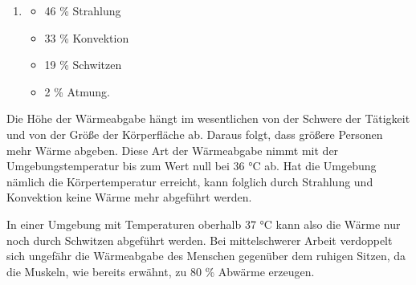 \begin{enumerate}
\item 
\begin{itemize}
	\item  46 \% Strahlung
	\item  33 \% Konvektion
	\item  19 \% Schwitzen
	\item   2 \% Atmung.
\end{itemize}
\end{enumerate}	

Die Höhe der Wärmeabgabe hängt im wesentlichen von der Schwere der Tätigkeit und von der Größe der Körperfläche ab. Daraus folgt, dass größere Personen mehr Wärme abgeben. Diese Art der Wärmeabgabe nimmt mit der Umgebungstemperatur bis zum Wert null bei 36 °C ab. Hat die Umgebung nämlich die Körpertemperatur erreicht, kann folglich durch Strahlung und Konvektion keine Wärme mehr abgeführt werden.\protect\cite{MenschWaerme}

In einer Umgebung mit Temperaturen oberhalb 37 °C kann also die Wärme
nur noch durch Schwitzen abgeführt werden. Bei mittelschwerer Arbeit verdoppelt sich
ungefähr die Wärmeabgabe des Menschen gegenüber dem ruhigen Sitzen, da die Muskeln,
wie bereits erwähnt, zu 80 \% Abwärme erzeugen. 

